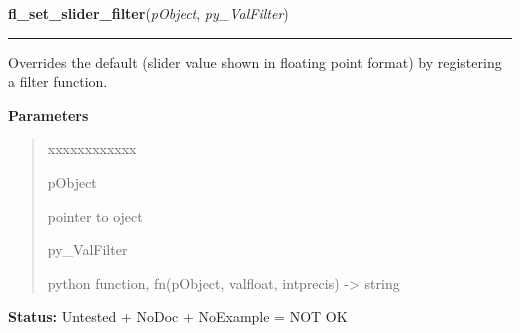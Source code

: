 \hspace{.8\funcindent}\begin{boxedminipage}{\funcwidth}

    \raggedright \textbf{fl\_set\_slider\_filter}(\textit{pObject}, \textit{py\_ValFilter})

    \vspace{-1.5ex}

    \rule{\textwidth}{0.5\fboxrule}
\setlength{\parskip}{2ex}
    Overrides the default (slider value shown in floating point format) by 
    registering a filter function.

\setlength{\parskip}{1ex}
      \textbf{Parameters}
      \vspace{-1ex}

      \begin{quote}
        \begin{Ventry}{xxxxxxxxxxxx}

          \item[pObject]

          pointer to oject

          \item[py\_ValFilter]

          python function, fn(pObject, valfloat, intprecis) -{\textgreater}
          string

        \end{Ventry}

      \end{quote}

\textbf{Status:} Untested + NoDoc + NoExample = NOT OK



    \end{boxedminipage}

    \label{xformslib:library:fl_add_spinner}

    \vspace{0.5ex}

